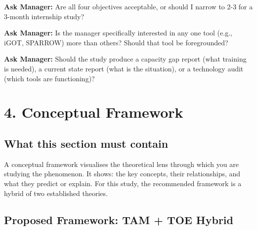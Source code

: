 \documentclass[12pt,a4paper]{article}
\newcommand{\managerQ}[1]{%
  \begin{tcolorbox}[colback=govgold!10,colframe=govgold,boxrule=0.5pt,arc=2mm,
    left=4pt,right=4pt,top=2pt,bottom=2pt]
    \small\textbf{Ask Manager:} #1
  \end{tcolorbox}
}
\begin{document}
\managerQ{Are all four objectives acceptable, or should I narrow to 2-3 for a 3-month internship study?}

\managerQ{Is the manager specifically interested in any one tool (e.g., iGOT, SPARROW) more than others? Should that tool be foregrounded?}

\managerQ{Should the study produce a capacity gap report (what training is needed), a current state report (what is the situation), or a technology audit (which tools are functioning)?}

\vspace{0.4cm}

\section{4. Conceptual Framework}

\subsection{What this section must contain}
A conceptual framework visualises the theoretical lens through which you are studying the phenomenon. It shows: the key concepts, their relationships, and what they predict or explain. For this study, the recommended framework is a hybrid of two established theories.

\subsection{Proposed Framework: TAM + TOE Hybrid}
\end{document}
